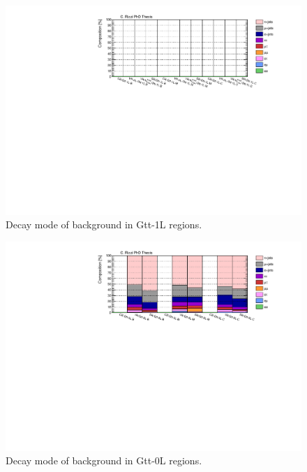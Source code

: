 \begin{figure}[h]
\includegraphics[width=\textwidth]{figures/strong_prod/comp_plots/Gtt_1L_tt.pdf}
\caption{Decay mode of \ttbar background in Gtt-1L regions.}
	\label{fig:ttcomp_Gtt1L}
\end{figure}

\begin{figure}[h]
\includegraphics[width=\textwidth]{figures/strong_prod/comp_plots/Gtt_0L_tt.pdf}
\caption{Decay mode of \ttbar background in Gtt-0L regions.}
	\label{fig:ttcomp_Gtt0L}
\end{figure}

